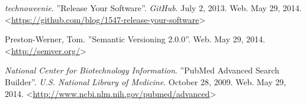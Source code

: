  \textit{technoweenie}. ''Release Your Software''.
\textit{GitHub}. July 2, 2013. Web. May 29, 2014. <\url{https://github.com/blog/1547-release-your-software}>

 Preston-Werner, Tom.  ''Semantic Versioning 2.0.0''. Web.
May 29, 2014. <\url{http://semver.org/}>

 \textit{National Center for Biotechnology
Information}.  ''PubMed Advanced Search Builder''. \textit{U.S. National Library
of Medicine}. October 28, 2009. Web. May 29, 2014. <\url{http://www.ncbi.nlm.nih.gov/pubmed/advanced}>
